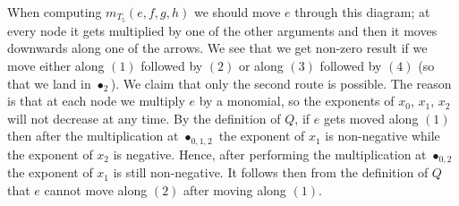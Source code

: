 \documentclass[pdftex]{sigma}
\numberwithin{equation}{section}
\begin{document}
When computing $m_{T_5}(e,f,g,h)$ we should move $e$ through this diagram; at every node it gets multiplied by one of the other arguments and then it moves downwards along one of the arrows. We see that we get non-zero result if we move either along $(1)$ followed by $(2)$ or along $(3)$ followed by $(4)$ (so that we land in $\bullet_2$).
We claim that only the second route is possible. The reason is that at each node we multiply $e$ by a monomial, so the exponents of $x_0$, $x_1$, $x_2$ will not decrease at any time. By the definition of $Q$, if $e$ gets moved along $(1)$ then after the multiplication at $\bullet_{0,1,2}$
the exponent of $x_1$ is non-negative while the exponent of $x_2$ is negative. Hence, after performing the multiplication at $\bullet_{0,2}$ the exponent of $x_1$ is still non-negative.
It follows then from the definition of $Q$ that $e$ cannot move along $(2)$ after moving along $(1)$.
\end{document}

